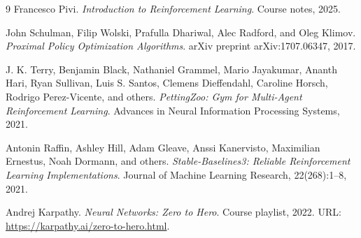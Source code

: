 \documentclass{article}
\begin{document}
\begin{thebibliography}{9}
Francesco Pivi.
\textit{Introduction to Reinforcement Learning}.
Course notes, 2025.

John Schulman, Filip Wolski, Prafulla Dhariwal, Alec Radford, and Oleg Klimov.
\textit{Proximal Policy Optimization Algorithms}.
arXiv preprint arXiv:1707.06347, 2017.

J. K. Terry, Benjamin Black, Nathaniel Grammel, Mario Jayakumar, Ananth Hari, Ryan Sullivan, Luis S. Santos, Clemens Dieffendahl, Caroline Horsch, Rodrigo Perez-Vicente, and others.
\textit{PettingZoo: Gym for Multi-Agent Reinforcement Learning}.
Advances in Neural Information Processing Systems, 2021.

Antonin Raffin, Ashley Hill, Adam Gleave, Anssi Kanervisto, Maximilian Ernestus, Noah Dormann, and others.
\textit{Stable-Baselines3: Reliable Reinforcement Learning Implementations}.
Journal of Machine Learning Research, 22(268):1--8, 2021.

Andrej Karpathy.
\textit{Neural Networks: Zero to Hero}.
Course playlist, 2022.
URL: \url{https://karpathy.ai/zero-to-hero.html}.
\end{thebibliography}
\end{document}
